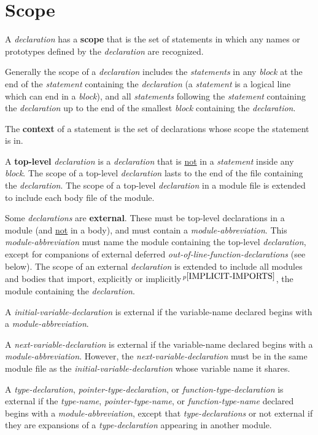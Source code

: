 \documentclass[12pt]{article}
\newcommand{\key}[1]{{\rm \bfseries #1}}
\newcommand{\pagnote}[1]{$\,^{p\pageref{#1}}$}
\begin{document}
\section{Scope}
\label{SCOPE}

A {\em declaration} has a \key{scope}
that is the set of statements in which any
names or prototypes defined by the {\em declaration}
are recognized.

Generally the scope of a {\em declaration} includes the {\em statements}
in any {\em block} at the end of the {\em statement}
containing the {\em declaration} (a {\em statement} is a
logical line which can end in a {\em block}), and
all {\em statements} following the {\em statement} containing
the {\em declaration} up to the end of the smallest {\em block}
containing the {\em declaration}.

The \key{context}\label{CONTEXT} of a statement is the set of declarations
whose scope the statement is in.

A \key{top-level} {\em declaration} is a {\em declaration} that is
\underline{not} in a {\em statement} inside any {\em block}.
The scope of a top-level {\em declaration} lasts to the end of the
file containing the {\em declaration}.
The scope of a top-level {\em declaration} in a module file is extended
to include each body file of the module.

Some {\em declarations} are \key{external}\label{EXTERNAL}.
These must be top-level declarations in a module (and \underline{not}
in a body), and must contain a {\em module-abbreviation}.
This {\em module-abbreviation} must name the module containing
the top-level {\em declaration}, except for
companions of external deferred
{\em out-of-line-function-declarations} (see below).
The scope of an external
{\em declaration} is extended to include all modules and bodies that
import, explicitly or implicitly\pagnote{IMPLICIT-IMPORTS},
the module containing the {\em declaration}.

A {\em initial-variable-declaration}
is external if the {variable-name} declared begins with a
{\em module-abbreviation}.

A {\em next-variable-declaration}
is external if the {variable-name} declared begins with a
{\em module-abbreviation}.  However, the {\em next-variable-declaration}
must be in the same module file as the {\em initial-variable-declaration}
whose variable name it shares.

A {\em type-declaration}, {\em pointer-type-declaration}, or
{\em function-type-declaration}
\label{EXTERNAL-TYPE-NAME}
is external if the {\em type-name}, {\em pointer-type-name},
or {\em function-type-name}
declared begins with a
{\em module-abbrev\-i\-a\-tion}, except that {\em type-declarations}
or not external if they are expansions of a {\em type-declaration}
appearing in another module.
\end{document}
